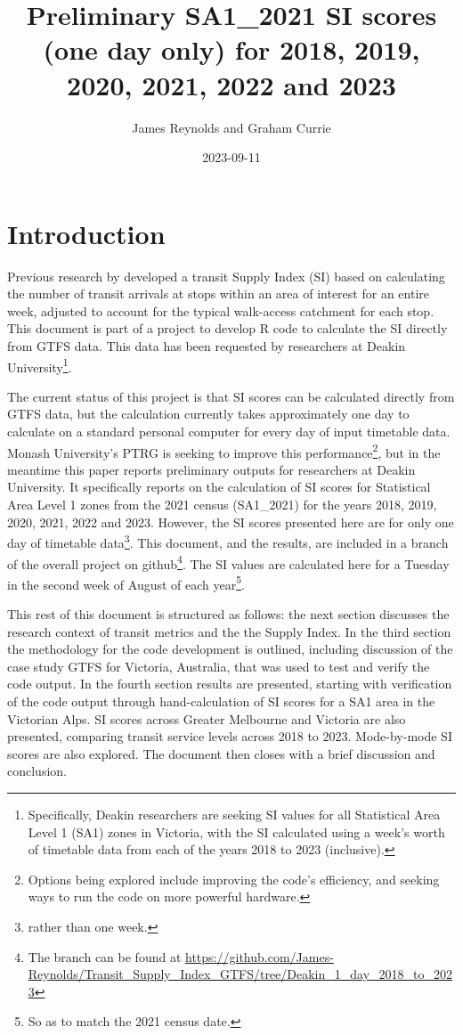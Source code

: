 \documentclass[]{tufte-book}
\title[Reynolds and Currie]{Preliminary SA1\_2021 SI scores (one day
only) for 2018, 2019, 2020, 2021, 2022 and 2023}
\author{James Reynolds and Graham Currie}
\date{2023-09-11}
\begin{document}
\maketitle




\hypertarget{introduction}{%
\chapter{Introduction}\label{introduction}}

Previous research by \citet{currie2007identifying} developed a transit
Supply Index (SI) based on calculating the number of transit arrivals at
stops within an area of interest for an entire week, adjusted to account
for the typical walk-access catchment for each stop. This document is
part of a project to develop R code to calculate the SI directly from
GTFS data. This data has been requested by researchers at Deakin
University\footnote{Specifically, Deakin researchers are seeking SI
  values for all Statistical Area Level 1 (SA1) zones in Victoria, with
  the SI calculated using a week's worth of timetable data from each of
  the years 2018 to 2023 (inclusive).}.

The current status of this project is that SI scores can be calculated
directly from GTFS data, but the calculation currently takes
approximately one day to calculate on a standard personal computer for
every day of input timetable data. Monash University's PTRG is seeking
to improve this performance\footnote{Options being explored include
  improving the code's efficiency, and seeking ways to run the code on
  more powerful hardware.}, but in the meantime this paper reports
preliminary outputs for researchers at Deakin University. It
specifically reports on the calculation of SI scores for Statistical
Area Level 1 zones from the 2021 census (SA1\_2021) for the years 2018,
2019, 2020, 2021, 2022 and 2023. However, the SI scores presented here
are for only one day of timetable data\footnote{rather than one week.}.
This document, and the results, are included in a branch of the overall
project on github\footnote{The branch can be found at
  \url{https://github.com/James-Reynolds/Transit_Supply_Index_GTFS/tree/Deakin_1_day_2018_to_2023}}.
The SI values are calculated here for a Tuesday in the second week of
August of each year\footnote{So as to match the 2021 census date.}.

This rest of this document is structured as follows: the next section
discusses the research context of transit metrics and the the Supply
Index. In the third section the methodology for the code development is
outlined, including discussion of the case study GTFS for Victoria,
Australia, that was used to test and verify the code output. In the
fourth section results are presented, starting with verification of the
code output through hand-calculation of SI scores for a SA1 area in the
Victorian Alps. SI scores across Greater Melbourne and Victoria are also
presented, comparing transit service levels across 2018 to 2023.
Mode-by-mode SI scores are also explored. The document then closes with
a brief discussion and conclusion.
\end{document}
